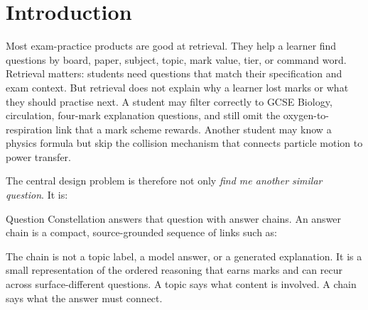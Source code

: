 \documentclass[11pt]{article}
\begin{document}

\section{Introduction}

Most exam-practice products are good at retrieval. They help a learner find questions by board, paper, subject, topic, mark value, tier, or command word. Retrieval matters: students need questions that match their specification and exam context. But retrieval does not explain why a learner lost marks or what they should practise next. A student may filter correctly to GCSE Biology, circulation, four-mark explanation questions, and still omit the oxygen-to-respiration link that a mark scheme rewards. Another student may know a physics formula but skip the collision mechanism that connects particle motion to power transfer.

The central design problem is therefore not only \textit{find me another similar question}. It is:

\begin{center}
\end{center}

Question Constellation answers that question with answer chains. An answer chain is a compact, source-grounded sequence of links such as:

\begin{center}
\end{center}

The chain is not a topic label, a model answer, or a generated explanation. It is a small representation of the ordered reasoning that earns marks and can recur across surface-different questions. A topic says what content is involved. A chain says what the answer must connect.

\end{document}
